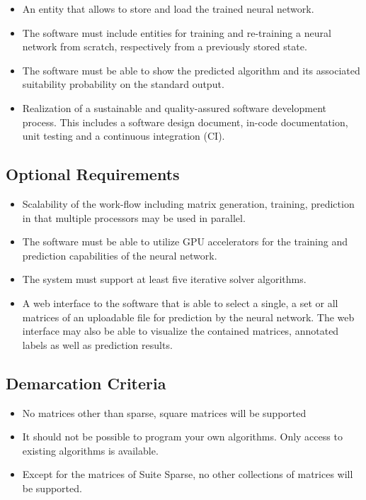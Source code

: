 \documentclass[parskip=full]{scrartcl}
\begin{document}
\begin{itemize}
\item An entity that allows to store and load the trained \gls{neural network}.

\item The software must include entities for training and re-training a \gls{neural network} from scratch, respectively from a previously stored state.

\item The software must be able to show the predicted \gls{algorithm} and its associated suitability probability on the standard output.

\item Realization of a sustainable and quality-assured software development process. This includes a software design document, in-code documentation, unit testing and a continuous integration (CI).

\end{itemize}

\subsection{Optional Requirements}

\begin{itemize}
    
\item Scalability of the work-flow including matrix generation, training, prediction in that multiple processors may be used in parallel.

\item The software must be able to utilize \gls{GPU} accelerators for the training and prediction capabilities of the \gls{neural network}.

\item The system must support at least five \gls{iterative solver} \glspl{algorithm}.

\item A web interface to the software that is able to select a single, a set or all matrices of an uploadable file for prediction by the \gls{neural network}. The web interface may also be able to visualize the contained matrices, annotated labels as well as prediction results.

\end{itemize}

\subsection{Demarcation Criteria}
\begin{itemize}
\item No matrices other than sparse, square matrices will be supported

\item It should not be possible to program your own algorithms. Only access to existing algorithms is available.

\item Except for the matrices of \gls{Suite Sparse}, no other collections of matrices will be supported.

\end{itemize}
\end{document}
